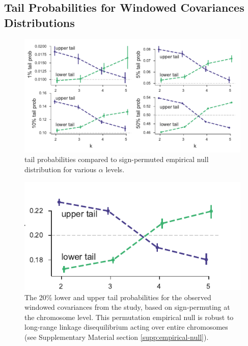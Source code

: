 \documentclass[11pt]{article}
\begin{document}
\clearpage
\subsection{\textcite{Barghi2019-qy} Tail Probabilities for Windowed Covariances Distributions}

\begin{figure}[!ht]
  \centering
  \includegraphics[]{figures/barghi-tailprobs-panels.pdf}

  \caption{\textcite{Barghi2019-qy} tail probabilities compared to
  sign-permuted empirical null distribution for various $\alpha$ levels.}

  \label{suppfig:barghi-tailprobs-panels}
\end{figure}

\begin{figure}[!ht]
  \centering

  \includegraphics[]{figures/barghi-tailprobs-seqid-20.pdf}

  \caption{The 20\% lower and upper tail probabilities for the observed
    windowed covariances from the \textcite{Barghi2019-qy} study, based on
    sign-permuting at the chromosome level. This permutation empirical null is
    robust to long-range linkage disequilibrium acting over entire chromosomes
  (see Supplementary Material section \ref{supp:empirical-null}).}
  
  \label{suppfig:barghi-tailprobs-seqid}
\end{figure}
\end{document}
